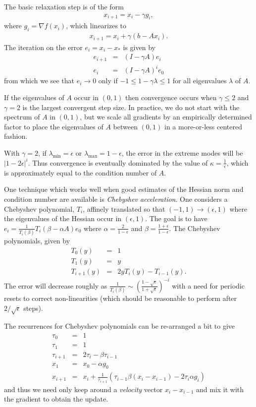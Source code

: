 \documentclass{article}
\newcommand{\beas}{\begin{eqnarray*}}
\newcommand{\enas}{\end{eqnarray*}}
\begin{document}
The basic relaxation step is of the form
\beas
  x_{i+1} = x_i - \gamma g_i,
\enas
where $g_i = \nabla f(x_i)$, which linearizes to
\beas
  x_{i+1} = x_i + \gamma (b - A x_i).
\enas
The iteration on the error $e_i = x_i - x_*$ is given by
\beas
  e_{i+1} &=& (I - \gamma A) e_i\\
  e_{i} &=& (I - \gamma A)^i e_0
\enas
from which we see that $e_i \rightarrow 0$ only if
$-1 \le 1 - \gamma \lambda \le 1$ for all eigenvalues $\lambda$ of $A$.

If the eigenvalues of $A$ occur in $(0,1)$ then convergence
occurs when $\gamma \le 2$ and $\gamma = 2$ is the largest convergent
step size.
In practice, we do not start with the spectrum of $A$ in $(0,1)$,
but we scale all gradients by an empirically determined factor to place
the eigenvalues of $A$ between $(0,1)$ in a more-or-less centered
fashion.

With $\gamma = 2$, if $\lambda_{\min} = \epsilon$ or
$\lambda_{\max} = 1-\epsilon$,
the error in the extreme modes will be $|1 - 2 \epsilon|^i$.
Thus convergence is eventually dominated
by the value of $\kappa = \frac{1}{\epsilon}$,
which is approximately equal to the condition number of $A$.

One technique which works well when good estimates of the Hessian
norm and condition number are available is {\em Chebyshev acceleration}.
One considers a Chebyshev polynomial, $T_i$, affinely
translated so that $(-1,1)\rightarrow (\epsilon,1)$ where the
eigenvalues of the Hessian occur in $(\epsilon,1)$.
The goal is to have $e_i =
\frac{1}{T_i(\beta)} T_i(\beta - \alpha A) e_0$ where $\alpha =
\frac{2}{1-\epsilon}$ and $\beta = \frac{1+\epsilon}{1-\epsilon}$.
The Chebyshev polynomials, given by
\beas
  T_0(y) &=& 1\\
  T_1(y) &=& y\\
  T_{i+1}(y) &=& 2 y T_{i}(y) - T_{i-1}(y).
\enas
The error will decrease roughly as
$\frac{1}{T_i(\beta)}
\sim \left(\frac{1-\sqrt{\epsilon}}{1+\sqrt{\epsilon}}\right)^{-i}$
with a need for periodic resets to correct non-linearities
(which should be reasonable to perform after $2/\sqrt{\epsilon}$ steps).

The recurrences for Chebyshev polynomials can be re-arranged a bit to
give
\beas
\tau_0 &=& 1\\
\tau_1 &=& 1\\
\tau_{i+1} &=& 2 \tau_i - \beta \tau_{i-1}\\
x_1 &=& x_0 - \alpha g_0\\
x_{i+1} &=& x_{i} +
\frac{1}{\tau_{i+1}}\left(\tau_{i-1} \beta (x_i-x_{i-1}) -2 \tau_i \alpha g_i\right)
\enas
and thus we need only keep around a {\em velocity} vector
$x_{i} - x_{i-1}$ and mix it with the gradient to obtain the
update.
\end{document}
